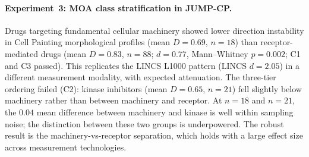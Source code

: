 \paragraph{Experiment~3: MOA class stratification in JUMP-CP.}
Drugs targeting fundamental cellular machinery showed lower direction instability in Cell Painting morphological profiles (mean $D = 0.69$, $n = 18$) than receptor-mediated drugs (mean $D = 0.83$, $n = 88$; $d = 0.77$, Mann--Whitney $p = 0.002$; C1 and C3 passed).
This replicates the LINCS L1000 pattern (LINCS $d = 2.05$) in a different measurement modality, with expected attenuation.
The three-tier ordering failed (C2): kinase inhibitors (mean $D = 0.65$, $n = 21$) fell slightly below machinery rather than between machinery and receptor.
At $n = 18$ and $n = 21$, the $0.04$ mean difference between machinery and kinase is well within sampling noise; the distinction between these two groups is underpowered.
The robust result is the machinery-vs-receptor separation, which holds with a large effect size across measurement technologies.
